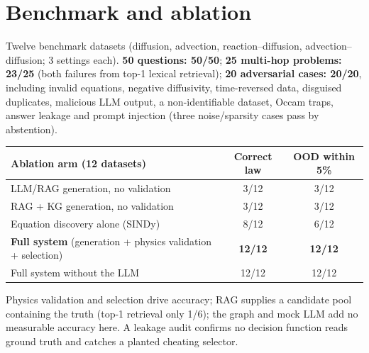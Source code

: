 \documentclass[11pt,a4paper]{article}
\begin{document}
\section{Benchmark and ablation}

Twelve benchmark datasets (diffusion, advection, reaction--diffusion, advection--diffusion; 3 settings each).
\textbf{50 questions: 50/50}; \textbf{25 multi-hop problems: 23/25} (both failures from top-1 lexical retrieval);
\textbf{20 adversarial cases: 20/20}, including invalid equations, negative diffusivity, time-reversed data, disguised
duplicates, malicious LLM output, a non-identifiable dataset, Occam traps, answer leakage and prompt injection (three
noise/sparsity cases pass by abstention).

\begin{center}
\small
\begin{tabular}{@{}lcc@{}}
\toprule
\textbf{Ablation arm} (12 datasets) & \textbf{Correct law} & \textbf{OOD within 5\%} \\ \midrule
LLM/RAG generation, no validation & 3/12 & 3/12 \\
RAG + KG generation, no validation & 3/12 & 3/12 \\
Equation discovery alone (SINDy) & 8/12 & 6/12 \\
\textbf{Full system} (generation + physics validation + selection) & \textbf{12/12} & \textbf{12/12} \\
Full system without the LLM & 12/12 & 12/12 \\
\bottomrule
\end{tabular}
\end{center}
Physics validation and selection drive accuracy; RAG supplies a candidate pool containing the truth (top-1 retrieval
only 1/6); the graph and mock LLM add no measurable accuracy here. A leakage audit confirms no decision function
reads ground truth and catches a planted cheating selector.

\end{document}
